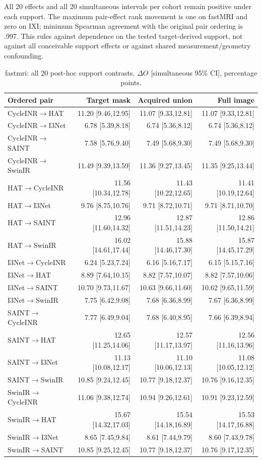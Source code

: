 All 20 effects and all 20 simultaneous intervals per cohort remain positive under each support. The maximum pair-effect rank movement is one on fastMRI and zero on IXI; minimum Spearman agreement with the original pair ordering is .997. This rules against dependence on the tested target-derived support, not against all conceivable support effects or against shared measurement/geometry confounding.
\begin{table}[t]\centering\scriptsize
\caption{fastmri: all 20 post-hoc support contrasts. $\Delta O$ [simultaneous 95\% CI], percentage points.}\label{tab:support-fastmri}\setlength{\tabcolsep}{4pt}
\begin{tabular}{lrrr}\toprule
Ordered pair & Target mask & Acquired union & Full image\\\midrule
CycleINR$\to$HAT & 11.20 [9.46,12.95] & 11.07 [9.33,12.81] & 11.07 [9.33,12.81] \\
CycleINR$\to$I3Net & 6.78 [5.39,8.18] & 6.74 [5.36,8.12] & 6.74 [5.36,8.12] \\
CycleINR$\to$SAINT & 7.58 [5.76,9.40] & 7.49 [5.68,9.30] & 7.49 [5.68,9.30] \\
CycleINR$\to$SwinIR & 11.49 [9.39,13.59] & 11.36 [9.27,13.45] & 11.35 [9.25,13.44] \\
HAT$\to$CycleINR & 11.56 [10.34,12.78] & 11.43 [10.22,12.65] & 11.41 [10.19,12.64] \\
HAT$\to$I3Net & 9.76 [8.75,10.76] & 9.71 [8.72,10.71] & 9.71 [8.71,10.70] \\
HAT$\to$SAINT & 12.96 [11.60,14.32] & 12.87 [11.51,14.23] & 12.86 [11.50,14.21] \\
HAT$\to$SwinIR & 16.02 [14.61,17.44] & 15.88 [14.46,17.30] & 15.87 [14.45,17.29] \\
I3Net$\to$CycleINR & 6.24 [5.23,7.24] & 6.16 [5.16,7.17] & 6.15 [5.15,7.16] \\
I3Net$\to$HAT & 8.89 [7.64,10.15] & 8.82 [7.57,10.07] & 8.82 [7.57,10.06] \\
I3Net$\to$SAINT & 10.70 [9.73,11.67] & 10.63 [9.66,11.60] & 10.62 [9.65,11.59] \\
I3Net$\to$SwinIR & 7.75 [6.42,9.08] & 7.68 [6.36,8.99] & 7.67 [6.36,8.99] \\
SAINT$\to$CycleINR & 7.77 [6.49,9.04] & 7.68 [6.40,8.95] & 7.66 [6.39,8.94] \\
SAINT$\to$HAT & 12.65 [11.25,14.06] & 12.57 [11.17,13.97] & 12.56 [11.16,13.96] \\
SAINT$\to$I3Net & 11.13 [10.08,12.17] & 11.10 [10.06,12.13] & 11.08 [10.05,12.12] \\
SAINT$\to$SwinIR & 10.85 [9.24,12.45] & 10.77 [9.18,12.37] & 10.76 [9.16,12.35] \\
SwinIR$\to$CycleINR & 11.06 [9.38,12.74] & 10.94 [9.26,12.61] & 10.91 [9.23,12.59] \\
SwinIR$\to$HAT & 15.67 [14.32,17.03] & 15.54 [14.18,16.89] & 15.53 [14.17,16.88] \\
SwinIR$\to$I3Net & 8.65 [7.45,9.84] & 8.61 [7.44,9.79] & 8.60 [7.43,9.78] \\
SwinIR$\to$SAINT & 10.85 [9.25,12.45] & 10.77 [9.18,12.37] & 10.76 [9.17,12.35] \\\bottomrule\end{tabular}\end{table}
